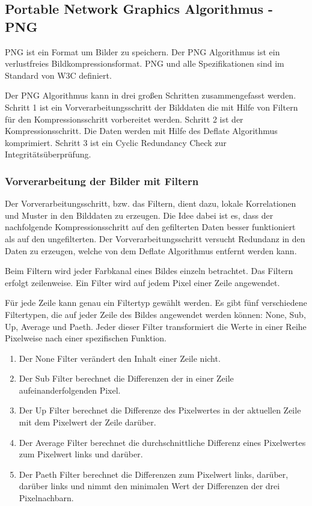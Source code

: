 \documentclass[conference]{IEEEtran}
\begin{document}
\subsection{Portable Network Graphics Algorithmus - PNG}

PNG ist ein Format um Bilder zu speichern.
Der PNG Algorithmus ist ein verlustfreies Bildkompressionsformat.
PNG und alle Spezifikationen sind im Standard von W3C definiert. \cite{w3c}

Der PNG Algorithmus kann in drei großen Schritten zusammengefasst werden.
Schritt 1 ist ein Vorverarbeitungsschritt der Bilddaten die mit Hilfe von
Filtern für den Kompressionsschritt vorbereitet werden.
Schritt 2 ist der Kompressionsschritt.
Die Daten werden mit Hilfe des Deflate Algorithmus komprimiert.
Schritt 3 ist ein Cyclic Redundancy Check zur Integritätsüberprüfung.


\subsubsection{Vorverarbeitung der Bilder mit Filtern}

Der Vorverarbeitungsschritt, bzw. das Filtern, dient dazu, lokale Korrelationen und
Muster in den Bilddaten zu erzeugen.
Die Idee dabei ist es, dass der nachfolgende Kompressionsschritt
auf den gefilterten Daten besser funktioniert als auf den ungefilterten.
Der Vorverarbeitungsschritt versucht Redundanz in den Daten zu erzeugen, welche
von dem Deflate Algorithmus entfernt werden kann.

Beim Filtern wird jeder Farbkanal eines Bildes einzeln betrachtet.
Das Filtern erfolgt zeilenweise.
Ein Filter wird auf jedem Pixel einer Zeile angewendet.

Für jede Zeile kann genau ein Filtertyp gewählt werden.
Es gibt fünf verschiedene Filtertypen, die auf jeder Zeile
des Bildes angewendet werden können: None, Sub, Up, Average und Paeth.
Jeder dieser Filter transformiert die Werte in einer Reihe Pixelweise nach einer spezifischen
Funktion.

\begin{enumerate}
  \item Der None Filter verändert den Inhalt einer Zeile nicht.
  \item Der Sub Filter berechnet die Differenzen der in einer Zeile aufeinanderfolgenden Pixel.
  \item Der Up Filter berechnet die Differenze des Pixelwertes in der aktuellen Zeile mit
        dem Pixelwert der Zeile darüber.
  \item Der Average Filter berechnet die durchschnittliche Differenz eines Pixelwertes zum
        Pixelwert links und darüber.
  \item Der Paeth Filter berechnet die Differenzen zum Pixelwert links, darüber, darüber links und nimmt den
        minimalen Wert der Differenzen der drei Pixelnachbarn.
\end{enumerate}
\end{document}
